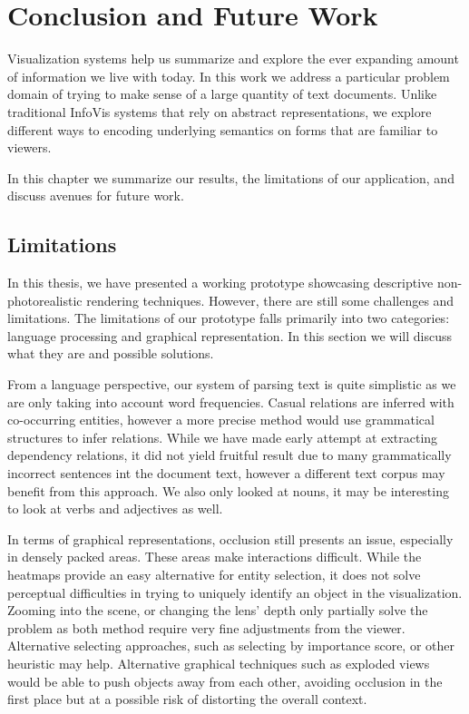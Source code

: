 \chapter{Conclusion and Future Work}
Visualization systems help us summarize and explore the ever expanding amount of
information we live with today. In this work we address a particular problem
domain of trying to make sense of a large quantity of text documents. Unlike
traditional InfoVis systems that rely on abstract representations, we explore different ways
to encoding underlying semantics on forms that are familiar to viewers. 

In this chapter we summarize our results, the limitations of our
application, and discuss avenues for future work.

\section{Limitations}
In this thesis, we have presented a working prototype showcasing descriptive
non-photorealistic rendering techniques. However, there are still some
challenges and limitations. The limitations of our prototype falls primarily into two
categories: language processing and graphical representation. In this section we
will discuss what they are and possible solutions.

From a language perspective, our system of parsing text is quite simplistic as
we are only taking into account word frequencies. Casual relations are inferred with
co-occurring entities, however a more precise method would use grammatical
structures to infer relations. While we have made early attempt at extracting
dependency relations, it did not yield fruitful result due to many grammatically
incorrect sentences int the document text, however a different text
corpus may benefit from this approach. We also only looked at nouns, it may be
interesting to look at verbs and adjectives as well.

In terms of graphical representations, occlusion still presents an issue,
especially in densely packed areas. These areas make interactions difficult.
While the heatmaps provide an easy alternative for entity selection, it does not
solve perceptual difficulties in trying to uniquely identify an object in the
visualization. Zooming into the scene, or changing the lens' depth only
partially solve the problem as both method require very fine adjustments from
the viewer. Alternative selecting approaches, such as selecting by importance score,
or other heuristic may help. Alternative graphical techniques such as exploded
views would be able to push objects away from each other, avoiding occlusion in
the first place but at a possible risk of distorting the overall context.


